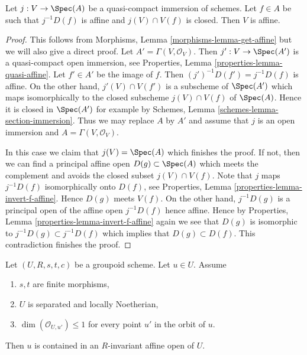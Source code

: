 \begin{lemma}
\label{lemma-get-affine}
Let $j : V \to \Spec(A)$ be a quasi-compact immersion of schemes.
Let $f \in A$ be such that $j^{-1}D(f)$ is affine and $j(V) \cap V(f)$
is closed. Then $V$ is affine.
\end{lemma}

\begin{proof}
This follows from Morphisms, Lemma \ref{morphisms-lemma-get-affine}
but we will also give a direct proof.
Let $A' = \Gamma(V, \mathcal{O}_V)$. Then $j' : V \to \Spec(A')$ is a
quasi-compact open immersion, see
Properties, Lemma \ref{properties-lemma-quasi-affine}.
Let $f' \in A'$ be the image of $f$. Then $(j')^{-1}D(f') = j^{-1}D(f)$
is affine. On the other hand, $j'(V) \cap V(f')$ is a subscheme of
$\Spec(A')$ which maps isomorphically to the closed subscheme
$j(V) \cap V(f)$ of $\Spec(A)$. Hence it is closed in $\Spec(A')$
for example by Schemes, Lemma \ref{schemes-lemma-section-immersion}.
Thus we may replace $A$ by $A'$ and assume that $j$ is an open immersion
and $A = \Gamma(V, \mathcal{O}_V)$.

\medskip\noindent
In this case we claim that $j(V) = \Spec(A)$ which finishes the proof.
If not, then we can find a principal affine open $D(g) \subset \Spec(A)$
which meets the complement and avoids the closed subset $j(V) \cap V(f)$.
Note that $j$ maps $j^{-1}D(f)$ isomorphically onto $D(f)$, see
Properties, Lemma \ref{properties-lemma-invert-f-affine}.
Hence $D(g)$ meets $V(f)$. On the other hand, $j^{-1}D(g)$
is a principal open of the affine open $j^{-1}D(f)$ hence affine.
Hence by
Properties, Lemma \ref{properties-lemma-invert-f-affine}
again we see that $D(g)$ is isomorphic to $j^{-1}D(g) \subset j^{-1}D(f)$
which implies that $D(g) \subset D(f)$. This contradiction finishes
the proof.
\end{proof}

\begin{lemma}
\label{lemma-find-affine-codimension-1}
Let $(U, R, s, t, c)$ be a groupoid scheme. Let $u \in U$. Assume
\begin{enumerate}
\item $s, t$ are finite morphisms,
\item $U$ is separated and locally Noetherian,
\item $\dim(\mathcal{O}_{U, u'}) \leq 1$ for every point $u'$
in the orbit of $u$.
\end{enumerate}
Then $u$ is contained in an $R$-invariant affine open of $U$.
\end{lemma}

